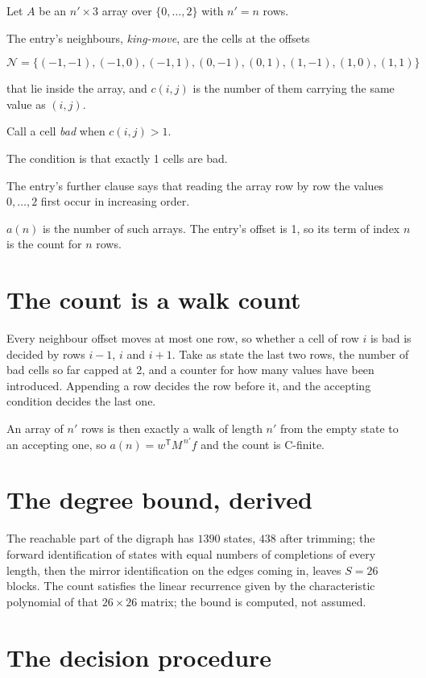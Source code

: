 \documentclass[11pt]{article}
\theoremstyle{definition}
\begin{document}
Let $A$ be an $n' \times 3$ array over $\{0,\dots,2\}$ with $n' = n$ rows.

The entry's neighbours, {\itshape king-move}, are the cells at the offsets

\[\mathcal{N} = \{(-1,-1), (-1,0), (-1,1), (0,-1), (0,1), (1,-1), (1,0), (1,1)\}\]

that lie inside the array, and $c(i,j)$ is the number of them carrying the same value as $(i,j)$.

Call a cell {\itshape bad} when $c(i,j) > 1$.

The condition is that exactly 1 cells are bad.

The entry's further clause says that reading the array row by row the values $0,\dots,2$ first occur in increasing order.

$a(n)$ is the number of such arrays. The entry's offset is 1, so its term of index $n$ is the count for $n$ rows.

\section{The count is a walk count}

Every neighbour offset moves at most one row, so whether a cell of row $i$ is bad is decided by rows $i-1$, $i$ and $i+1$. Take as state the last two rows, the number of bad cells so far capped at 2, and a counter for how many values have been introduced. Appending a row decides the row before it, and the accepting condition decides the last one.

An array of $n'$ rows is then exactly a walk of length $n'$ from the empty state to an accepting one, so $a(n) = w^{\mathsf T}M^{\,n'}f$ and the count is C-finite.

\section{The degree bound, derived}

The reachable part of the digraph has $1390$ states, $438$ after trimming; the forward identification of states with equal numbers of completions of every length, then the mirror identification on the edges coming in, leaves $S = 26$ blocks. The count satisfies the linear recurrence given by the characteristic polynomial of that $26\times26$ matrix; the bound is computed, not assumed.

\section{The decision procedure}
\end{document}
